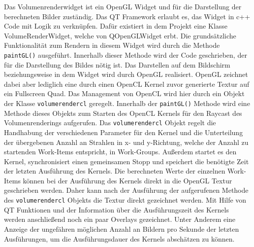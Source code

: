 Das Volumenrenderwidget ist ein OpenGL Widget und für die Darstellung der berechneten Bilder zuständig.
Das QT Framework erlaubt es, das Widget in c++ Code mit Logik zu verknüpfen.
Dafür existiert in dem Projekt eine Klasse VolumeRenderWidget, welche von QOpenGLWidget erbt.
Die grundsätzliche Funktionalität zum Rendern in diesem Widget wird durch die Methode \texttt{paintGL()} ausgeführt.
Innerhalb dieser Methode wird der Code geschrieben, der für die Darstellung des Bildes nötig ist.
Das Darstellen auf dem Bildschirm beziehungsweise in dem Widget wird durch OpenGL realisiert.
OpenGL zeichnet dabei aber lediglich eine durch einen OpenCL Kernel zuvor generierte Textur auf ein Fullscreen Quad.
Das Management von OpenCL wird hier durch ein Objekt der Klasse \texttt{volumerendercl} geregelt.
Innerhalb der \texttt{paintGL()} Methode wird eine Methode dieses Objekts zum Starten des OpenCL Kernels für den Raycast des Volumenrenderings aufgerufen.
Das \texttt{volumerendercl} Objekt regelt die Handhabung der verschiedenen Parameter für den Kernel und die Unterteilung der übergebenen Anzahl an Strahlen in x- und y-Richtung, welche der Anzahl zu startenden Work-Items entspricht, in Work-Groups.
Außerdem startet es den Kernel, synchronisiert einen gemeinsamen Stopp und speichert die benötigte Zeit der letzten Ausführung des Kernels.
Die berechneten Werte der einzelnen Work-Items können bei der Ausführung des Kernels direkt in die OpenGL Textur geschrieben werden.
Daher kann nach der Ausführung der aufgerufenen Methode des \texttt{volumerendercl} Objekts die Textur direkt gezeichnet werden.
Mit Hilfe von QT Funktionen und der Information über die Ausführungszeit des Kernels werden anschließend noch ein paar Overlays gezeichnet.
Unter Anderem eine Anzeige der ungefähren möglichen Anzahl an Bildern pro Sekunde der letzten Ausführungen, um die Ausführungsdauer des Kernels abschätzen zu können.

